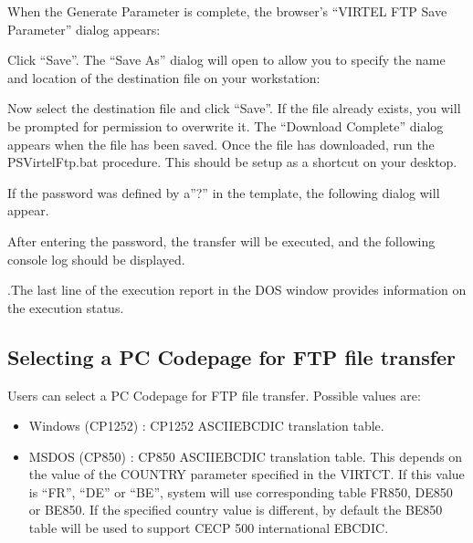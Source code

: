 \documentclass[letterpaper,10pt,english]{sphinxmanual}
\begin{document}
\sphinxAtStartPar
When the Generate Parameter is complete, the browser’s “VIRTEL FTP Save Parameter” dialog appears:

\sphinxAtStartPar
{}

\sphinxAtStartPar
{}

\sphinxAtStartPar
Click “Save”. The “Save As” dialog will open to allow you to specify the name and location of the destination file on your workstation:

\sphinxAtStartPar
{}

\sphinxAtStartPar
{}

\sphinxAtStartPar
Now select the destination file and click “Save”. If the file already exists, you will be prompted for permission to overwrite it. The “Download Complete” dialog appears when the file has been saved. Once the file has downloaded, run the PSVirtelFtp.bat procedure. This should be setup as a shortcut on your desktop.

\sphinxAtStartPar
If the password was defined by a”?” in the template, the following dialog will appear.

\sphinxAtStartPar
{}

\sphinxAtStartPar
{}

\sphinxAtStartPar
After entering the password, the transfer will be executed, and the following console log should be displayed.

\sphinxAtStartPar
{}

\sphinxAtStartPar
{}

\sphinxAtStartPar
.The last line of the execution report in the DOS window provides information on the execution status.


\subsection{Selecting a PC Codepage for FTP file transfer}
\label{\detokenize{Customization:selecting-a-pc-codepage-for-ftp-file-transfer}}
\sphinxAtStartPar
Users can select a PC Codepage for FTP file transfer. Possible values are: \sphinxhyphen{}
\begin{itemize}
\item {} 
\sphinxAtStartPar
Windows (CP\sphinxhyphen{}1252) : CP\sphinxhyphen{}1252 ASCII\sphinxhyphen{}EBCDIC translation table.

\item {} 
\sphinxAtStartPar
MS\sphinxhyphen{}DOS (CP\sphinxhyphen{}850) : CP\sphinxhyphen{}850 ASCII\sphinxhyphen{}EBCDIC translation table. This depends on the value of the COUNTRY parameter specified in the VIRTCT. If this value is “FR”, “DE” or “BE”, system will use corresponding table FR\sphinxhyphen{}850, DE\sphinxhyphen{}850 or BE\sphinxhyphen{}850. If the specified country value is different, by default the BE\sphinxhyphen{}850 table will be used to support CECP 500 international EBCDIC.

\end{itemize}
\end{document}
